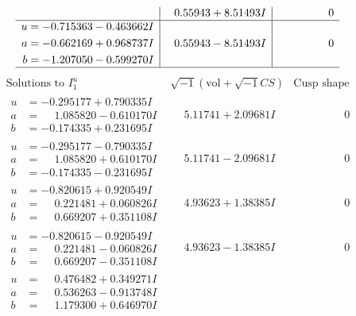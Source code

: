 \documentclass[1p]{elsarticle_modified}
\theoremstyle{definition}
\newcommand{\I}{\sqrt{-1}}
\begin{document}
$$\begin{array}{c|c|c}
 & \phantom{-}0.55943 + 8.51493 I & \phantom{-0.000000 } 0 \\ \hline\begin{aligned}
u &= -0.715363 - 0.463662 I \\
a &= -0.662169 + 0.968737 I \\
b &= -1.207050 - 0.599270 I\end{aligned}
 & \phantom{-}0.55943 - 8.51493 I & \phantom{-0.000000 } 0\\
 \hline 
 \end{array}$$\newpage$$\begin{array}{c|c|c}  
\text{Solutions to }I^u_{1}& \I (\text{vol} + \sqrt{-1}CS) & \text{Cusp shape}\\
 \hline 
\begin{aligned}
u &= -0.295177 + 0.790335 I \\
a &= \phantom{-}1.085820 - 0.610170 I \\
b &= -0.174335 + 0.231695 I\end{aligned}
 & \phantom{-}5.11741 + 2.09681 I & \phantom{-0.000000 } 0 \\ \hline\begin{aligned}
u &= -0.295177 - 0.790335 I \\
a &= \phantom{-}1.085820 + 0.610170 I \\
b &= -0.174335 - 0.231695 I\end{aligned}
 & \phantom{-}5.11741 - 2.09681 I & \phantom{-0.000000 } 0 \\ \hline\begin{aligned}
u &= -0.820615 + 0.920549 I \\
a &= \phantom{-}0.221481 + 0.060826 I \\
b &= \phantom{-}0.669207 + 0.351108 I\end{aligned}
 & \phantom{-}4.93623 + 1.38385 I & \phantom{-0.000000 } 0 \\ \hline\begin{aligned}
u &= -0.820615 - 0.920549 I \\
a &= \phantom{-}0.221481 - 0.060826 I \\
b &= \phantom{-}0.669207 - 0.351108 I\end{aligned}
 & \phantom{-}4.93623 - 1.38385 I & \phantom{-0.000000 } 0 \\ \hline\begin{aligned}
u &= \phantom{-}0.476482 + 0.349271 I \\
a &= \phantom{-}0.536263 - 0.913748 I \\
b &= \phantom{-}1.179300 + 0.646970 I\end{aligned}

\end{array}$$
\end{document}
